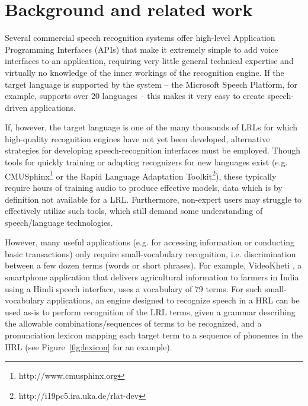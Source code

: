 \documentclass[11pt]{article}
\begin{document}
\section{Background and related work}
\label{sec:background}
Several commercial speech recognition systems offer high-level Application Programming Interfaces (APIs) that 
make it extremely simple to add voice interfaces to an application, requiring
very little general technical expertise and virtually no knowledge of the inner workings of the recognition engine. If the target language is supported by the system -- the Microsoft Speech Platform, for example, supports 
over 20 languages \cite{mspsdk} -- this makes it very easy 
to create speech-driven applications. 

If, however, the target language is one of the many thousands of LRLs for which high-quality recognition engines have not yet been developed, alternative strategies for developing speech-recognition interfaces must be employed.
Though tools for quickly training or adapting recognizers for new languages exist (e.g. CMUSphinx\footnote{http://www.cmusphinx.org} or the Rapid Language Adaptation Toolkit\footnote{http://i19pc5.ira.uka.de/rlat-dev}), these typically require hours of training audio to produce effective models, 
data which is by definition not available for a LRL.
Furthermore, non-expert users may struggle to effectively utilize such tools, which still demand some understanding of speech/language technologies.

However, many useful %
applications (e.g. for accessing information or conducting basic transactions) only require small-vocabulary recognition, i.e. discrimination between
a few dozen terms (words or short phrases).
For example, VideoKheti \cite{bali13}, a smartphone application that delivers agricultural information to farmers in India using a Hindi speech interface, uses a vocabulary of 79 terms.
For such small-vocabulary applications, 
an engine designed to recognize speech in a HRL
can be used as-is to perform recognition of the LRL terms,
given
a grammar describing the allowable combinations/sequences of terms to be recognized, and a pronunciation lexicon mapping each target term to a sequence of phonemes in the HRL 
(see Figure~\ref{fig:lexicon} for an example).
\end{document}
